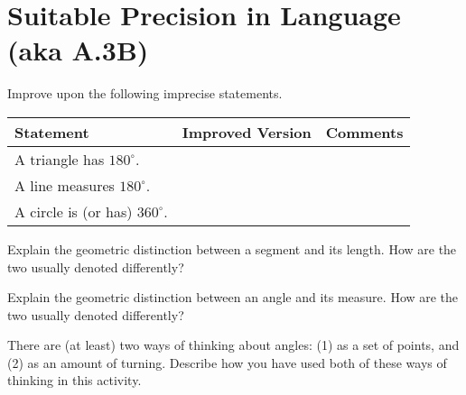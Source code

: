 \newpage
\section{Suitable Precision in Language (aka A.3B)}


\begin{prob}
Improve upon the following imprecise statements. 

{\renewcommand{\arraystretch}{1.5}
\begin{tabular}{|>{\centering\arraybackslash}m{4cm}|>{\centering\arraybackslash}m{9.5cm}|>{\centering\arraybackslash}m{4cm}|}\hline
Statement & Improved Version & Comments \\\hline

\rule{0pt}{1cm}A triangle has $180^\circ$. & & \\ \hline

\rule{0pt}{1cm}A line measures $180^\circ$. & & \\ \hline

\rule{0pt}{1cm}A circle is (or has) $360^\circ$. & & \\ \hline
 \hline
\end{tabular}}
\end{prob}

\begin{prob}
Explain the geometric distinction between a segment and its length.  How are the two usually denoted differently?  
\end{prob}
\vspace{.8in}

\begin{prob}
Explain the geometric distinction between an angle and its measure.  How are the two usually denoted differently?  
\end{prob}
\vspace{.8in}
\begin{prob}
There are (at least) two ways of thinking about angles:  (1) as a set of points, and (2) as an amount of turning.  
Describe how you have used both of these ways of thinking in this activity.  
\end{prob}

